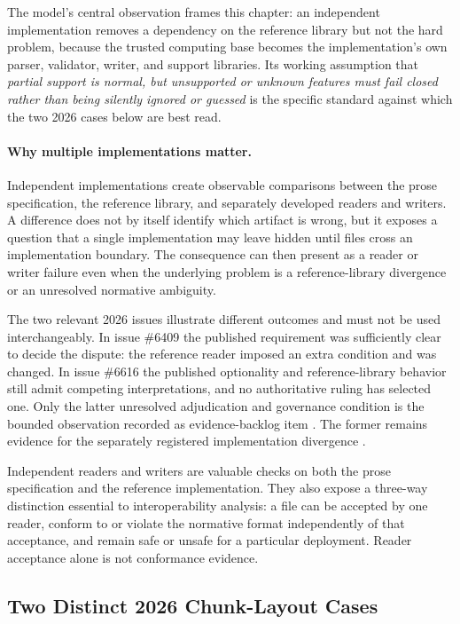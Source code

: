 \documentclass[../main.tex]{subfiles}
\begin{document}
The model's central observation frames this chapter: an independent
implementation removes a dependency on the reference library but not the hard
problem, because the trusted computing base becomes the implementation's own
parser, validator, writer, and support libraries. Its working assumption that
\emph{partial support is normal, but unsupported or unknown features must fail
closed rather than being silently ignored or guessed} is the specific standard
against which the two 2026 cases below are best read.

\paragraph{Why multiple implementations matter.}
Independent implementations create observable comparisons between the prose
specification, the reference library, and separately developed readers and
writers. A difference does not by itself identify which artifact is wrong, but
it exposes a question that a single implementation may leave hidden until files
cross an implementation boundary. The consequence can then present as a reader
or writer failure even when the underlying problem is a reference-library
divergence or an unresolved normative ambiguity.

The two relevant 2026 issues illustrate different outcomes and must not be used
interchangeably. In issue \#6409 the published requirement was sufficiently
clear to decide the dispute: the reference reader imposed an extra condition
and was changed. In issue \#6616 the published optionality and reference-library
behavior still admit competing interpretations, and no authoritative ruling has
selected one. Only the latter unresolved adjudication and governance condition
is the bounded observation recorded as evidence-backlog item
. The former remains
evidence for the separately registered implementation divergence
.

Independent readers and writers are valuable checks on both the prose
specification and the reference implementation. They also expose a three-way
distinction essential to interoperability analysis: a file can be accepted by
one reader, conform to or violate the normative format independently of that
acceptance, and remain safe or unsafe for a particular deployment. Reader
acceptance alone is not conformance evidence.

\subsection{Two Distinct 2026 Chunk-Layout Cases}
\end{document}
